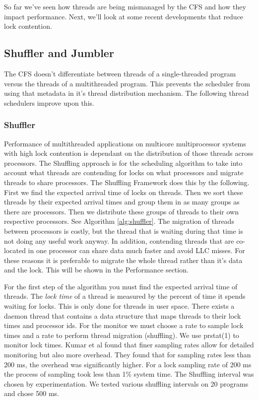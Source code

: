 \documentclass{sig-alternate}
\begin{document}
So far we've seen how threads are being mismanaged by the CFS and how they impact performance. Next, we'll look at some recent developments that reduce lock contention.

\subsection{Shuffler and Jumbler}
\label{sec:sj}

The CFS doesn't differentiate between threads of a single-threaded program versus the threads of a multithreaded program. This prevents the scheduler from using that metadata in it's thread distribution mechanism. The following thread schedulers improve upon this.

\subsubsection{Shuffler}
\label{sec:shuffler}

Performance of multithreaded applications on multicore multiprocessor systems with high lock contention is dependant on the distribution of those threads across processors. The Shuffling approach is for the scheduling algorithm to take into account what threads are contending for locks on what processors and migrate threads to share processors. The Shuffling Framework does this by the following. First we find the expected arrival time of locks on threads. Then we sort these threads by their expected arrival times and group them in as many groups as there are processors. Then we distribute these groups of threads to their own respective processors. See Algorithm \ref{alg:shuffler}. The migration of threads between processors is costly, but the thread that is waiting during that time is not doing any useful work anyway. In addition, contending threads that are co-located in one processor can share data much faster and avoid LLC misses. For these reasons it is preferable to migrate the whole thread rather than it's data and the lock. This will be shown in the Performance section.~\cite{KumarEtal:2014}

For the first step of the algorithm you must find the expected arrival time of threads. The \textit{lock time} of a thread is measured by the percent of time it spends waiting for locks. This is only done for threads in user space. There exists a daemon thread that contains a data structure that maps threads to their lock times and processor ids. For the monitor we must choose a rate to sample lock times and a rate to perform thread migration (shuffling). We use prstat(1) to monitor lock times. Kumar et al found that finer sampling rates allow for detailed monitoring but also more overhead. They found that for sampling rates less than 200 ms, the overhead was significantly higher. For a lock sampling rate of 200 ms the process of sampling took less than 1\% system time. The Shuffling interval was chosen by experimentation. We tested various shuffling intervals on 20 programs and chose 500 ms.
\end{document}
